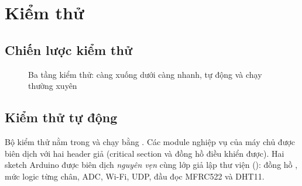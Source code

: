 \chapter{Kiểm thử}\label{chap:kiemthu}

\section{Chiến lược kiểm thử}
\begin{figure}[H]
\centering
{}
\caption{Ba tầng kiểm thử: càng xuống dưới càng nhanh, tự động và chạy thường xuyên}\label{fig:testpyramid}
\end{figure}

\section{Kiểm thử tự động}
Bộ kiểm thử nằm trong  và chạy bằng . Các module
nghiệp vụ của máy chủ được biên dịch với hai header giả (critical section và đồng hồ
điều khiển được). Hai sketch Arduino được biên dịch \emph{nguyên vẹn} cùng lớp giả lập
thư viện (): đồng hồ , mức logic từng chân, ADC,
Wi-Fi, UDP, đầu đọc MFRC522 và DHT11.

